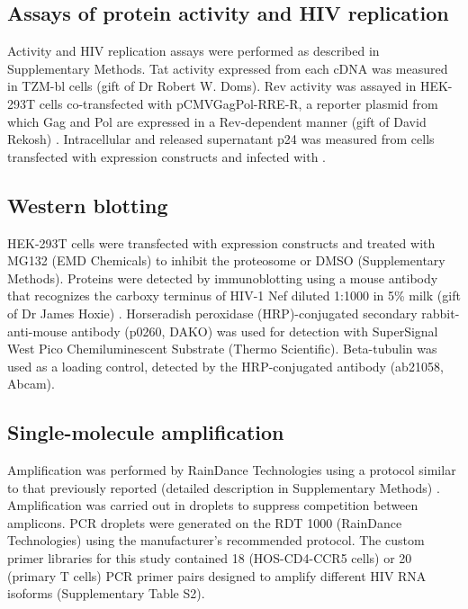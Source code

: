 \documentclass[../sherrill-Mix_thesis.tex]{subfiles}
\begin{document}
\subsection{Assays of protein activity and HIV replication}
Activity and HIV replication assays were performed as described in Supplementary Methods. Tat activity expressed from each cDNA was measured in TZM-bl cells \citep{Wei2003} (gift of Dr Robert W. Doms). Rev activity was assayed in HEK-293T cells co-transfected with pCMVGagPol-RRE-R, a reporter plasmid from which Gag and Pol are expressed in a Rev-dependent manner (gift of David Rekosh) \citep{Srinivasakumar1997}. Intracellular and released supernatant p24 was measured from cells transfected with expression constructs and infected with \hivEight{}.

\subsection{Western blotting}
HEK-293T cells were transfected with expression constructs and treated with MG132 (EMD Chemicals) to inhibit the proteosome or DMSO (Supplementary Methods). Proteins were detected by immunoblotting using a mouse antibody that recognizes the carboxy terminus of HIV-1 Nef diluted 1:1000 in 5\% milk (gift of Dr James Hoxie) \citep{Shugars1993}. Horseradish peroxidase (HRP)-conjugated secondary rabbit-anti-mouse antibody (p0260, DAKO) was used for detection with SuperSignal West Pico Chemiluminescent Substrate (Thermo Scientific). Beta-tubulin was used as a loading control, detected by the HRP-conjugated antibody (ab21058, Abcam). 

\subsection{Single-molecule amplification}
Amplification was performed by RainDance Technologies using a protocol similar to that previously reported (detailed description in Supplementary Methods) \citep{Tewhey2009}. Amplification was carried out in droplets to suppress competition between amplicons. PCR droplets were generated on the RDT 1000 (RainDance Technologies) using the manufacturer's recommended protocol. The custom primer libraries for this study contained 18 (HOS-CD4-CCR5 cells) or 20 (primary T cells) PCR primer pairs designed to amplify different HIV RNA isoforms (Supplementary Table S2). 
\end{document}
